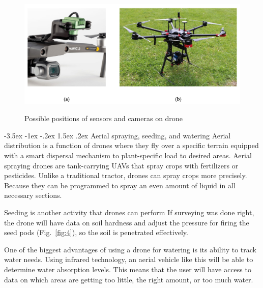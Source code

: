\documentclass[a4paper,10pt]{article}
\makeatletter
\theoremstyle{definition}
\renewcommand\subsection{\@startsection {subsection}{1}{\z@}%
                                   {-3.5ex \@plus -1ex \@minus -.2ex}%
                                   {1.5ex \@plus.2ex}%
                                   {\normalsize\bfseries}}
\makeatother
\begin{document}
\begin{figure}[h]
\begin{center}
\includegraphics[scale=0.1]{images/drones-04-00041-g003.png}
\caption{Possible positions of sensors and cameras on drone}\cite{drones4030041}
\label{fig:3}
\end{center}
\end{figure}

\subsection{Aerial spraying, seeding, and watering}
\label{subsec:3}
Aerial distribution is a function of drones where they fly over a specific terrain equipped with a smart dispersal mechanism to plant-specific load to desired areas. Aerial spraying drones are tank-carrying UAVs that spray crops with fertilizers or pesticides. Unlike a traditional tractor, drones can spray crops more precisely. Because they can be programmed to spray an even amount of liquid in all necessary sections.

Seeding is another activity that drones can perform If surveying was done right, the drone will have data on soil hardness and adjust the pressure for firing the seed pods (Fig.~\ref{fig:4}), so the soil is penetrated effectively. 

One of the biggest advantages of using a drone for watering is its ability to track water needs. Using infrared technology, an aerial vehicle like this will be able to determine water absorption levels. This means that the user will have access to data on which areas are getting too little, the right amount, or too much water. 
\cite{doi:10.1080/00380768.2020.1738899,agriculture_spreading, SUBRAMANIAM2021}
\end{document}
